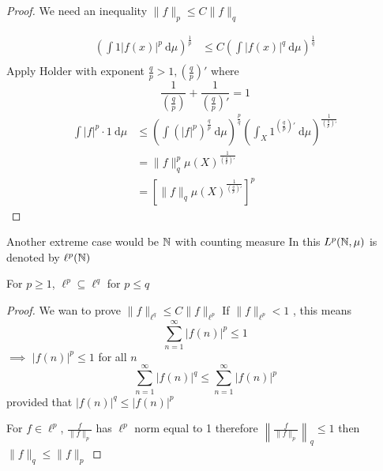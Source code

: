 \begin{proof}
  We need an inequality $\|f\|_p \le C \|f\|_q$

  \begin{align*}
    \left(\int 1 |f(x)|^p \ \mathrm{d}\mu\right)^{\frac1p} &\le C\left(\int |f(x)|^q \ \mathrm{d}\mu\right)^{\frac1q} \\
  \end{align*}
  Apply Holder with exponent $\frac{q}{p} > 1, \left(\frac{q}{p}\right)'$ where
  \[\frac1{\left(\frac qp\right)} + \frac1{\left(\frac qp\right)'} = 1\]
  \begin{align*}
    \int |f|^p \cdot 1\ \mathrm{d}\mu &\le \left(\int (|f|^p)^\frac{q}{p} \ \mathrm{d}\mu\right)^{\frac{p}{q}}\left(\int_X 1^{\left(\frac qp\right)'} \ \mathrm{d}\mu\right)^{\frac1{\left(\frac{q}p\right)'}} \\
    &= \|f\|_q^p\mu(X)^{\frac1{\left(\frac{q}p\right)'}} \\
    &= \left[\|f\|_q \mu(X)^{\frac1{\left(\frac{q}p\right)'}}\right]^p
  \end{align*}
\end{proof}

Another extreme case would be $\mathbb N$ with counting measure 
In this $L^p(\mathbb N, \mu)$ is denoted by $\ell^p(\mathbb N)$

\begin{theorem}
  For $p \ge 1$, $\ell^p \subseteq \ell^q$ for $p \le q$
\end{theorem}

\begin{proof}
  We wan to prove $\|f\|_{\ell^q} \le C\|f\|_{\ell^p}$
  If $\|f\|_{\ell^p} < 1$ , this means 
  \[\sum_{n=1}^\infty |f(n)|^p \le 1\]
  $\implies$ $|f(n)|^p \le 1$ for all $n$
  \[\sum_{n=1}^\infty |f(n)|^q \le \sum_{n=1}^\infty |f(n)|^p\]
  provided that $|f(n)|^q \le |f(n)|^p$

  For $f \in \ell^p$, $\frac{f}{\|f\|_p}$ has $\ell^p$ norm equal to 1
  therefore $\left\|\frac f{\|f\|_p}\right\|_q \le 1$ then $\|f\|_q \le \|f\|_p$
\end{proof}